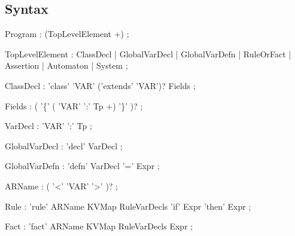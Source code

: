
\subsection{Syntax}\label{sec:syntax}

\hypertarget{syn:Program}{}
\begin{rail}
  Program : (TopLevelElement +)
  ;
\end{rail}

\hypertarget{syn:TopLevelElement}{}
\begin{rail}
TopLevelElement : ClassDecl     
                | GlobalVarDecl 
                | GlobalVarDefn 
                | RuleOrFact    
                | Assertion     
                | Automaton     
                | System        
;
\end{rail}

\hypertarget{syn:ClassDecl}{}
\begin{rail}
ClassDecl : 'class' 'VAR' ('extends' 'VAR')? Fields
;                
\end{rail}

\hypertarget{syn:Fields}{}
\begin{rail}
Fields : ( '\{' (  'VAR' ':' Tp  +) '\}' )?
;
\end{rail}

\hypertarget{syn:VarDecl}{}
\begin{rail}
VarDecl : 'VAR' ':' Tp
;
\end{rail}

\hypertarget{syn:GlobalVarDecl}{}
\begin{rail}
GlobalVarDecl : 'decl' VarDecl
;
\end{rail}


\hypertarget{syn:GlobalVarDefn}{}
\begin{rail}
GlobalVarDefn : 'defn' VarDecl '=' Expr  
;
\end{rail}

\hypertarget{syn:ARName}{}
\begin{rail}
ARName : ( '<' 'VAR' '>' )?
;
\end{rail}

\hypertarget{syn:Rule}{}
\begin{rail}
Rule : 'rule' ARName  KVMap RuleVarDecls 'if' Expr 'then' Expr
;
\end{rail}

\hypertarget{syn:Fact}{}
\begin{rail}
Fact : 'fact' ARName  KVMap RuleVarDecls Expr
;
\end{rail}

